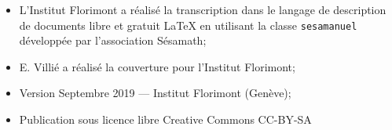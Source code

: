 \documentclass[TS]{sesamanuel}
\begin{document}
\newpage

\begin{prerequis}
\begin{itemize}
\item L'Institut Florimont a réalisé la transcription dans le langage de description de documents libre et gratuit \LaTeX{} en utilisant la classe \texttt{sesamanuel} développée par l'association Sésamath;
\item E. Villié a réalisé la couverture pour l'Institut Florimont;
\item Version Septembre 2019 --- Institut Florimont (Genève);
\item Publication sous licence libre Creative Commons CC-BY-SA
\end{itemize}
 \end{prerequis}

\vspace{1em}

\setcounter{page}{6}

\themaM







\AfficheListeMethodes
\AfficheCorriges[2]
\AfficheLexique
\end{document}
